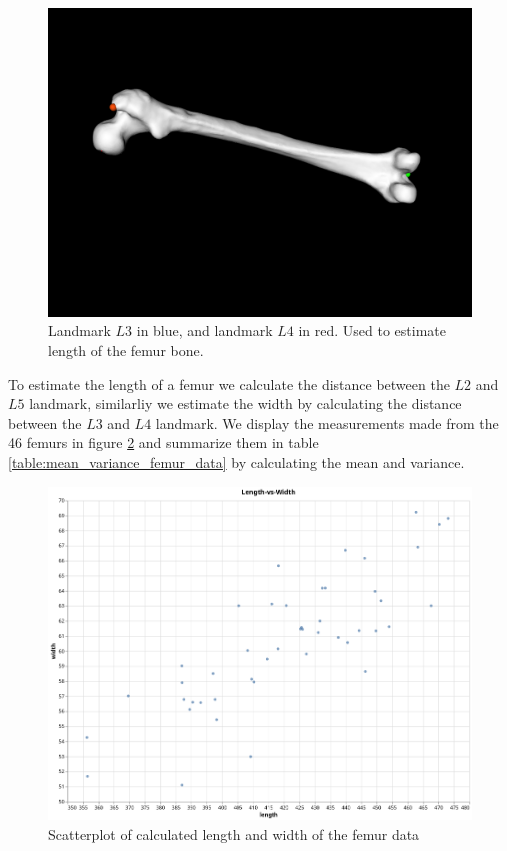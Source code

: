 \documentclass[10pt]{article}
\begin{document}
\begin{figure}[h]
\centering
\includegraphics[scale=0.2]{screenshots/L2red_L5green_length.png}
\caption{Landmark $L3$ in blue, and landmark $L4$ in red. Used to estimate length of the femur bone.}
\label{fig:landmark_length}
\end{figure}
\noindent
To estimate the length of a femur we calculate the distance between the $L2$ and $L5$ landmark, similarliy we estimate the width by calculating the distance between the $L3$ and $L4$ landmark. We display the measurements made from the 46 femurs in figure \ref{fig:scatterplot_femurdata} and summarize them in table \ref{table:mean_variance_femur_data} by calculating the mean and variance.
\begin{figure}
\centering
\includegraphics[scale=0.4]{screenshots/femur_data_length_width_scatter.png}
\caption{Scatterplot of calculated length and width of the femur data}
\label{fig:scatterplot_femurdata}
\end{figure}
\end{document}
